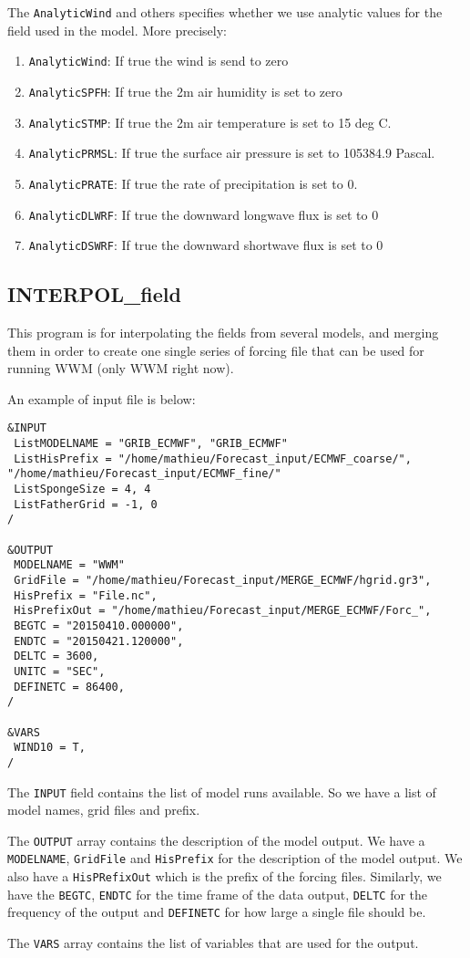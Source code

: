 \documentclass[12pt]{amsart}
\begin{document}
The {\tt AnalyticWind} and others specifies whether we use analytic values for the field used in the model.
More precisely:
\begin{enumerate}
\item {\tt AnalyticWind}: If true the wind is send to zero
\item {\tt AnalyticSPFH}: If true the 2m air humidity is set to zero
\item {\tt AnalyticSTMP}: If true the 2m air temperature is set to 15 deg C.
\item {\tt AnalyticPRMSL}: If true the surface air pressure is set to 105384.9 Pascal.
\item {\tt AnalyticPRATE}: If true the rate of precipitation is set to 0.
\item {\tt AnalyticDLWRF}: If true the downward longwave flux is set to 0
\item {\tt AnalyticDSWRF}: If true the downward shortwave flux is set to 0
\end{enumerate}



\subsection{INTERPOL\_field}

This program is for interpolating the fields from several models, and merging them in order to
create one single series of forcing file that can be used for running WWM (only WWM right now).

An example of input file is below:
\begin{verbatim}
&INPUT
 ListMODELNAME = "GRIB_ECMWF", "GRIB_ECMWF"
 ListHisPrefix = "/home/mathieu/Forecast_input/ECMWF_coarse/", "/home/mathieu/Forecast_input/ECMWF_fine/"
 ListSpongeSize = 4, 4
 ListFatherGrid = -1, 0
/

&OUTPUT
 MODELNAME = "WWM"
 GridFile = "/home/mathieu/Forecast_input/MERGE_ECMWF/hgrid.gr3",
 HisPrefix = "File.nc",
 HisPrefixOut = "/home/mathieu/Forecast_input/MERGE_ECMWF/Forc_",
 BEGTC = "20150410.000000",
 ENDTC = "20150421.120000",
 DELTC = 3600, 
 UNITC = "SEC", 
 DEFINETC = 86400,
/

&VARS
 WIND10 = T, 
/
\end{verbatim}
The {\tt INPUT} field contains the list of model runs available. So we have a list of model names, grid files and prefix.

The {\tt OUTPUT} array contains the description of the model output. We have a {\tt MODELNAME}, {\tt GridFile} and {\tt HisPrefix} for the description of the model output. We also have a {\tt HisPRefixOut} which is the prefix of the forcing files.
Similarly, we have the {\tt BEGTC}, {\tt ENDTC} for the time frame of the data output, {\tt DELTC} for the frequency of the output and {\tt DEFINETC} for how large a single file should be.

The {\tt VARS} array contains the list of variables that are used for the output.
\end{document}
